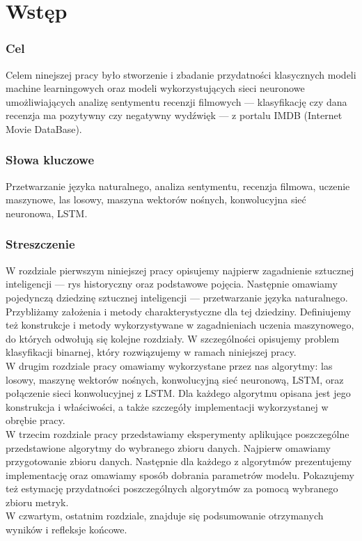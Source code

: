 \chapter*{Wstęp}

\subsection*{Cel}

Celem ninejszej pracy było stworzenie i zbadanie przydatności klasycznych modeli machine learningowych oraz modeli wykorzystujących sieci neuronowe umożliwiających analizę sentymentu recenzji filmowych --- klasyfikację czy dana recenzja ma pozytywny czy negatywny wydźwięk --- z portalu IMDB (Internet Movie DataBase).

\subsection*{Słowa kluczowe}

Przetwarzanie języka naturalnego, analiza sentymentu, recenzja filmowa, uczenie maszynowe, las losowy, maszyna wektorów nośnych, konwolucyjna sieć neuronowa, LSTM.

\subsection*{Streszczenie}

\indent W rozdziale pierwszym niniejszej pracy opisujemy najpierw zagadnienie sztucznej inteligencji --- rys historyczny oraz podstawowe pojęcia. Następnie omawiamy pojedynczą dziedzinę sztucznej inteligencji --- przetwarzanie języka naturalnego. Przybliżamy założenia i metody charakterystyczne dla tej dziedziny. Definiujemy też konstrukcje i metody wykorzystywane w zagadnieniach uczenia maszynowego, do których odwołują się kolejne rozdziały. W szczególności opisujemy problem klasyfikacji binarnej, który rozwiązujemy w ramach niniejszej pracy. \\

\noindent W drugim rozdziale pracy omawiamy wykorzystane przez nas algorytmy: las losowy, maszynę wektorów nośnych, konwolucyjną sieć neuronową, LSTM, oraz połączenie sieci konwolucyjnej z LSTM. Dla każdego algorytmu opisana jest jego konstrukcja i właściwości, a także szczegóły implementacji wykorzystanej w obrębie pracy. \\

\noindent W trzecim rozdziale pracy przedstawiamy eksperymenty aplikujące poszczególne przedstawione algorytmy do wybranego zbioru danych. Najpierw omawiamy przygotowanie zbioru danych. Następnie dla każdego z algorytmów prezentujemy implementację oraz omawiamy sposób dobrania parametrów modelu. Pokazujemy też estymację przydatności poszczególnych algorytmów za pomocą wybranego zbioru metryk. \\

\noindent W czwartym, ostatnim rozdziale, znajduje się podsumowanie otrzymanych wyników i refleksje końcowe.

